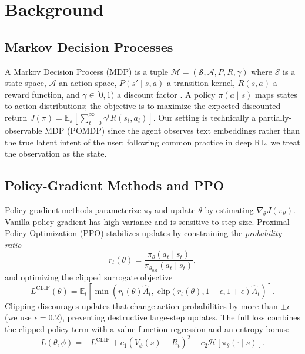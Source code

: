 \section{Background}
\label{sec:background}

\subsection{Markov Decision Processes}
A Markov Decision Process (MDP) is a tuple $\mathcal{M} = (\mathcal{S}, \mathcal{A}, P, R, \gamma)$ where $\mathcal{S}$ is a state space, $\mathcal{A}$ an action space, $P(s' \mid s, a)$ a transition kernel, $R(s,a)$ a reward function, and $\gamma \in [0,1)$ a discount factor \cite{sutton2018rlbook}. A policy $\pi(a \mid s)$ maps states to action distributions; the objective is to maximize the expected discounted return $J(\pi) = \mathbb{E}_{\pi}\!\left[\sum_{t=0}^\infty \gamma^t R(s_t,a_t)\right]$. Our setting is technically a partially-observable MDP (POMDP) since the agent observes text embeddings rather than the true latent intent of the user; following common practice in deep RL, we treat the observation as the state.

\subsection{Policy-Gradient Methods and PPO}
Policy-gradient methods \cite{sutton1999policygrad} parameterize $\pi_\theta$ and update $\theta$ by estimating $\nabla_\theta J(\pi_\theta)$. Vanilla policy gradient has high variance and is sensitive to step size. Proximal Policy Optimization (PPO) \cite{schulman2017ppo} stabilizes updates by constraining the \emph{probability ratio}
\begin{equation}
    r_t(\theta) = \frac{\pi_\theta(a_t \mid s_t)}{\pi_{\theta_{\text{old}}}(a_t \mid s_t)},
\end{equation}
and optimizing the clipped surrogate objective
\begin{equation}
\label{eq:ppo-clip}
    L^{\text{CLIP}}(\theta) = \mathbb{E}_t\!\left[\min\!\left(r_t(\theta)\hat{A}_t,\; \text{clip}(r_t(\theta), 1-\epsilon, 1+\epsilon)\hat{A}_t\right)\right].
\end{equation}
Clipping discourages updates that change action probabilities by more than $\pm\epsilon$ (we use $\epsilon = 0.2$), preventing destructive large-step updates. The full loss combines the clipped policy term with a value-function regression and an entropy bonus:
\begin{equation}
    L(\theta,\phi) = -L^{\text{CLIP}} + c_1 (V_\phi(s) - R_t)^2 - c_2 \mathcal{H}[\pi_\theta(\cdot \mid s)].
\end{equation}

